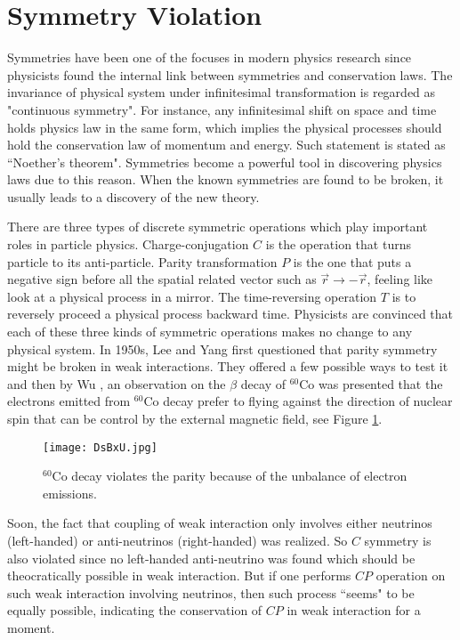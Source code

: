\section{Symmetry Violation}
Symmetries have been one of the focuses in modern physics research since physicists found the internal link between symmetries and conservation laws. The invariance of physical system under infinitesimal transformation is regarded as "continuous symmetry". For instance, any infinitesimal shift on space and time holds physics law in the same form, which implies the physical processes should hold the conservation law of momentum and energy. Such statement is stated as ``Noether’s theorem"\cite{noether}.  Symmetries become a powerful tool in discovering physics laws due to this reason. When the known symmetries are found to be broken, it usually leads to a discovery of the new theory.


There are three types of discrete symmetric operations which play important roles in particle physics. Charge-conjugation $\textit{C}$ is the operation that turns particle to its anti-particle. Parity transformation $\textit{P}$  is the one that puts a negative sign before all the spatial related vector such as $\overrightarrow{r} \to -\overrightarrow{r}$, feeling like look at a physical process in a mirror. The time-reversing operation $\textit{T}$ is to reversely proceed a physical process backward time.  Physicists are convinced that each of these three kinds of symmetric operations makes no change to any physical system. In 1950s, Lee and Yang \cite{PhysRev.104.254} first questioned that parity symmetry might be broken in weak interactions. They offered a few possible ways to test it and then by Wu \cite{Wu_exp}, an observation on the $\beta$ decay of $^{60}$Co was presented that the electrons emitted from  $^{60}$Co decay prefer to flying against the direction of nuclear spin that can be control by the external magnetic field, see Figure \ref{fig:Co60}.

\begin{figure}[htbp]
	\centering
	\texttt{[image: DsBxU.jpg]}
	\caption{$^{60}$Co decay violates the parity because of the unbalance of electron emissions.}
	\label{fig:Co60}
\end{figure}

Soon, the fact that coupling of weak interaction only involves either neutrinos (left-handed) or anti-neutrinos (right-handed) was realized. So $C$ symmetry is also violated since no left-handed anti-neutrino was found which should be theocratically possible in weak interaction. But if one performs $CP$ operation on such weak interaction involving neutrinos, then such process ``seems" to be equally possible, indicating the conservation of $CP$ in weak interaction for a moment. 

